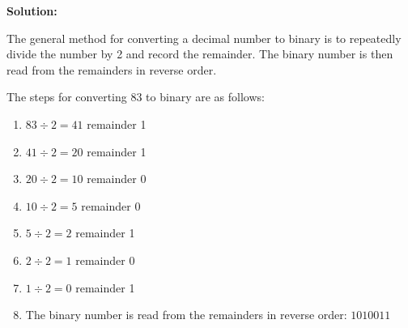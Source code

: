 \documentclass{article}
\begin{document}
\noindent \textbf{Solution:}

\vspace*{0.25cm}

\noindent The general method for converting a decimal number to binary is to repeatedly divide the number by 2 and record the remainder. 
The binary number is then read from the remainders in reverse order.

\vspace*{0.25cm}

\noindent The steps for converting 83 to binary are as follows:

\begin{enumerate}
    \item $83 \div 2 = 41$ remainder 1
    \item $41 \div 2 = 20$ remainder 1
    \item $20 \div 2 = 10$ remainder 0
    \item $10 \div 2 = 5$ remainder 0
    \item $5 \div 2 = 2$ remainder 1
    \item $2 \div 2 = 1$ remainder 0
    \item $1 \div 2 = 0$ remainder 1
    \item The binary number is read from the remainders in reverse order: $1010011$
\end{enumerate}

\vspace*{0.5cm}


\newpage
\end{document}
